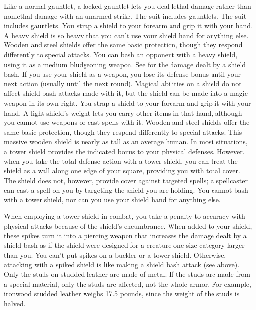 Like a normal gauntlet, a locked gauntlet lets you deal lethal damage rather than nonlethal damage with an unarmed strike.
 The suit includes gauntlets.
 The suit includes gauntlets.
 You strap a shield to your forearm and grip it with your hand. A heavy shield is so heavy that you can't use your shield hand for anything else.
 Wooden and steel shields offer the same basic protection, though they respond differently to special attacks.
 You can bash an opponent with a heavy shield, using it as a medium bludgeoning weapon. See  for the damage dealt by a shield bash.  If you use your shield as a weapon, you lose its defense bonus until your next action (usually until the next round). Magical abilities on a shield do not affect shield bash attacks made with it, but the shield can be made into a magic weapon in its own right.
 You strap a shield to your forearm and grip it with your hand. A light shield's weight lets you carry other items in that hand, although you cannot use weapons or cast spells with it.
 Wooden and steel shields offer the same basic protection, though they respond differently to special attacks.
 This massive wooden shield is nearly as tall as an average human. In most situations, a tower shield provides the indicated bonus to your physical defenses. However, when you take the total defense action with a tower shield, you can treat the shield as a wall along one edge of your square, providing you with total cover. The shield does not, however, provide cover against targeted spells; a spellcaster can cast a spell on you by targeting the shield you are holding. You cannot bash with a tower shield, nor can you use your shield hand for anything else.

When employing a tower shield in combat, you take a  penalty to accuracy with physical attacks because of the shield's encumbrance.
 When added to your shield, these spikes turn it into a piercing weapon that increases the damage dealt by a shield bash as if the shield were designed for a creature one size category larger than you. You can't put spikes on a buckler or a tower shield. Otherwise, attacking with a spiked shield is like making a shield bash attack (see above).
 Only the studs on studded leather are made of metal. If the studs are made from a special material, only the studs are affected, not the whole armor. For example, ironwood studded leather weighs 17.5 pounds, since the weight of the studs is halved.

